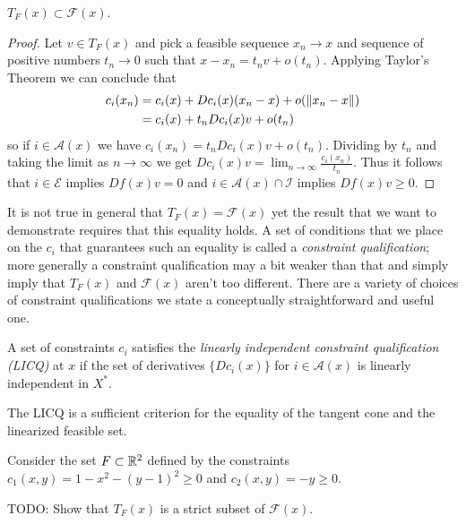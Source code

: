 \begin{prop}$T_F(x) \subset \mathcal{F}(x)$.
\end{prop}
\begin{proof}
Let $v \in T_F(x)$ and pick a feasible sequence $x_n \to x$ and
sequence of positive numbers $t_n
\to 0$ such that $x - x_n = t_nv + o(t_n)$.  Applying Taylor's Theorem
we can conclude that 
\begin{align*}
c_i(x_n) &= c_i(x) + Dc_i(x) (x_n - x) + o(\lVert x_n-x \rVert) \\
&= c_i(x) + t_n Dc_i(x) v + o(t_n) 
\end{align*}
so if $i \in \mathcal{A}(x)$ we have $c_i(x_n) = t_n Dc_i(x) v +
o(t_n)$. Dividing by $t_n$ and taking the limit as $n \to
\infty$ we get $Dc_i(x) v = \lim_{n \to \infty}
\frac{c_i(x_n)}{t_n}$.  Thus it follows that  $i \in \mathcal{E}$
implies $Df(x) v = 0$ and $i \in \mathcal{A}(x) \cap \mathcal{I}$
implies $Df(x) v \geq 0$.
\end{proof}
It is not true in general that $T_F(x) = \mathcal{F}(x)$ yet the
result that we want to demonstrate requires that this equality holds.
A set of conditions that we place on the $c_i$ that guarantees such an
equality is called a \emph{constraint qualification}; more generally a
constraint qualification may a bit weaker than that and simply imply
that $T_F(x)$ and $\mathcal{F}(x)$ aren't too different.  There are a
variety of choices of constraint qualifications we state a
conceptually straightforward and useful one.
\begin{defn}A set of constraints $c_i$ satisfies the \emph{linearly
    independent constraint qualification (LICQ)} at $x$ if the set of
  derivatives $\lbrace Dc_i(x) \rbrace$ for $i \in \mathcal{A}(x)$ is
  linearly independent in $X^*$.
\end{defn}
The LICQ is a sufficient criterion for the equality of the tangent
cone and the linearized feasible set.

\begin{examp}Consider the set $F \subset \mathbb{R}^2$ defined by the
  constraints $c_1(x,y) = 1 - x^2 - (y-1)^2 \geq 0$ and $c_2(x,y) =
  -y \geq 0$.

TODO: Show that $T_F(x)$ is a strict subset of $\mathcal{F}(x)$.
\end{examp}

